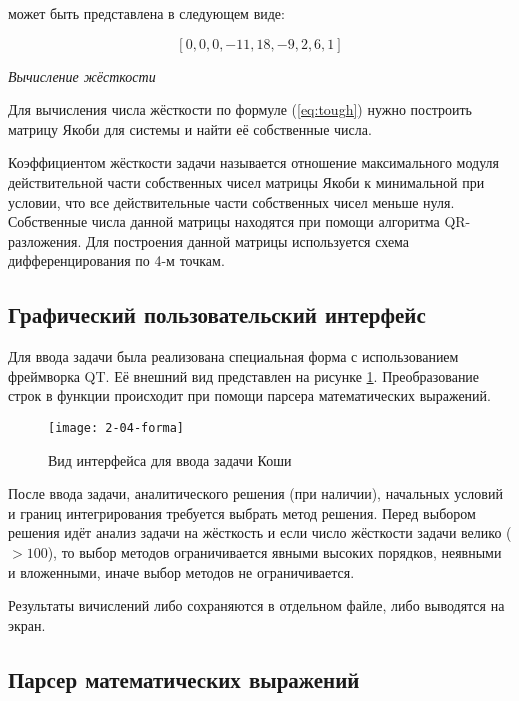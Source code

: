может быть представлена в следующем виде:

$$
[0, 0, 0, -11, 18, -9, 2, 6, 1]
$$

\textit{Вычисление жёсткости}

Для вычисления числа жёсткости по формуле (\ref{eq:tough}) нужно построить матрицу Якоби для системы и найти её собственные числа.

Коэффициентом жёсткости задачи называется отношение максимального модуля действительной части собственных чисел матрицы Якоби к
минимальной при условии, что все действительные части собственных чисел меньше нуля. Собственные числа данной матрицы находятся
при помощи алгоритма QR-разложения. Для построения данной матрицы используется схема дифференцирования по 4-м точкам.

\subsection{Графический пользовательский интерфейс}

Для ввода задачи была реализована специальная форма с использованием фреймворка QT. Её внешний вид представлен на рисунке \ref{fig:forma1}.
Преобразование строк в функции происходит при помощи парсера математических выражений.

\begin{figure}
    \texttt{[image: 2-04-forma]}
    \caption{Вид интерфейса для ввода задачи Коши}
    \label{fig:forma1}
\end{figure}

После ввода задачи, аналитического решения (при наличии), начальных условий и границ интегрирования требуется выбрать метод решения.
Перед выбором решения идёт анализ задачи на жёсткость и если число жёсткости задачи велико ($> 100$), то выбор методов ограничивается
явными высоких порядков, неявными и вложенными, иначе выбор методов не ограничивается.


Результаты вичислений либо сохраняются в отдельном файле, либо выводятся на экран.

\subsection{Парсер математических выражений}

